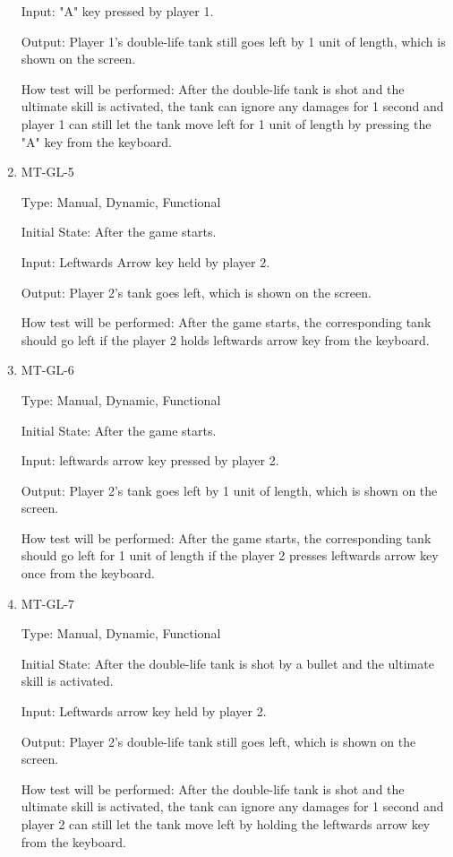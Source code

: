 \documentclass[12pt, titlepage]{article}
\begin{document}
\begin{enumerate}
Input: "A" key pressed by player 1.
					
Output: Player 1's double-life tank still goes left by 1 unit of length, which is shown on the screen.
					
How test will be performed: After the double-life tank is shot and the ultimate skill is activated, the tank can ignore any damages for 1 second and player 1 can still let the tank move left for 1 unit of length by pressing the "A" key from the keyboard.

\item{MT-GL-5\\}

Type: Manual, Dynamic, Functional
					
Initial State: After the game starts.
					
Input: Leftwards Arrow key held by player 2.
					
Output: Player 2's tank goes left, which is shown on the screen.
					
How test will be performed: After the game starts, the corresponding tank should go left if the player 2 holds leftwards arrow key from the keyboard. 
					
\item{MT-GL-6\\}

Type: Manual, Dynamic, Functional
					
Initial State: After the game starts.
					
Input: leftwards arrow key pressed by player 2.
					
Output: Player 2's tank goes left by 1 unit of length, which is shown on the screen.
					
How test will be performed: After the game starts, the corresponding tank should go left for 1 unit of length if the player 2 presses leftwards arrow key once from the keyboard. 

\item{MT-GL-7\\}

Type: Manual, Dynamic, Functional
					
Initial State: After the double-life tank is shot by a bullet and the ultimate skill is activated.
					
Input: Leftwards arrow key held by player 2.
					
Output: Player 2's double-life tank still goes left, which is shown on the screen.
					
How test will be performed: After the double-life tank is shot and the ultimate skill is activated, the tank can ignore any damages for 1 second and player 2 can still let the tank move left by holding the leftwards arrow key from the keyboard.


\end{enumerate}
\end{document}
